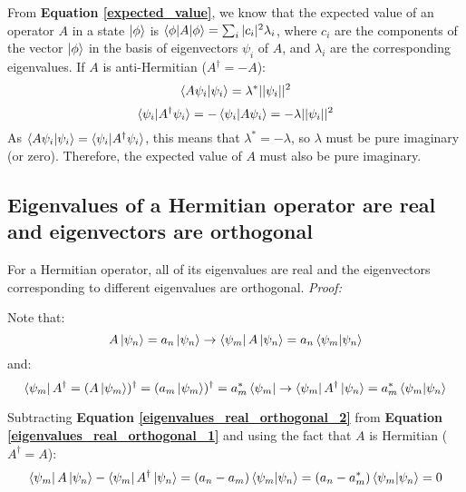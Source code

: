 From \textbf{Equation \ref{expected_value}}, we know that the expected value of an operator $A$ in a state $\ket{\phi}$ is $\braket{\phi|A|\phi} = \sum_i|c_i|^2\lambda_i$, where $c_i$ are the components of the vector $\ket{\phi}$ in the basis of eigenvectors $\psi_i$ of $A$, and $\lambda_i$ are the corresponding eigenvalues. If $A$ is anti-Hermitian ($A^\dagger = -A$):
\begin{equation}
    \braket{A\psi_i|\psi_i} = \lambda^*||\psi_i||^2
\end{equation}
\begin{equation}
    \braket{\psi_i|A^\dagger\psi_i} = -\braket{\psi_i|A\psi_i} = -\lambda||\psi_i||^2
\end{equation} 
As $\braket{A\psi_i|\psi_i} = \braket{\psi_i|A^\dagger \psi_i}$, this means that $\lambda^* = -\lambda$, so $\lambda$ must be pure imaginary (or zero). Therefore, the expected value of $A$ must also be pure imaginary.

\subsection{Eigenvalues of a Hermitian operator are real and eigenvectors are orthogonal} \label{eigenvalues_real_orthogonal}

For a Hermitian operator, all of its eigenvalues are real and the eigenvectors corresponding to different eigenvalues are orthogonal. \textit{Proof:}

Note that:
\begin{equation} \label{eigenvalues_real_orthogonal_1}
    A\ket{\psi_n} = a_n\ket{\psi_n} \to \bra{\psi_m}A\ket{\psi_n} = a_n\braket{\psi_m|\psi_n}
\end{equation}
and:
\begin{equation} \label{eigenvalues_real_orthogonal_2}
    \bra{\psi_m} A^{\dagger} = (A\ket{\psi_m})^\dagger = (a_m\ket{\psi_m})^\dagger = a_m^*\bra{\psi_m} \to \bra{\psi_m}A^\dagger\ket{\psi_n} = a_m^*\braket{\psi_m|\psi_n} 
\end{equation}

Subtracting \textbf{Equation \ref{eigenvalues_real_orthogonal_2}} from \textbf{Equation \ref{eigenvalues_real_orthogonal_1}} and using the fact that $A$ is Hermitian ($A^\dagger = A$):
\begin{equation}
    \bra{\psi_m}A\ket{\psi_n} - \bra{\psi_m}A^\dagger\ket{\psi_n} = (a_n - a_m)\braket{\psi_m|\psi_n} = (a_n - a_m^*)\braket{\psi_m|\psi_n} = 0
\end{equation}

